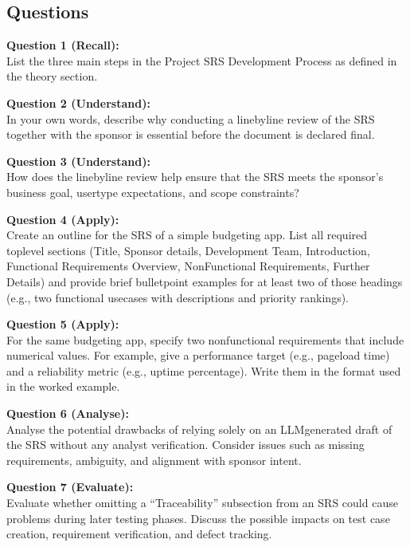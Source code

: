 \documentclass[12pt, a4paper]{article}
\begin{document}
\subsection*{Questions}
\textbf{Question 1 (Recall):}\\
List the three main steps in the Project SRS Development Process as defined in the theory section.\newpage

\textbf{Question 2 (Understand):}\\
In your own words, describe why conducting a linebyline review of the SRS together with the sponsor is essential before the document is declared final.\newpage

\textbf{Question 3 (Understand):}\\
How does the linebyline review help ensure that the SRS meets the sponsor's business goal, usertype expectations, and scope constraints?\newpage

\textbf{Question 4 (Apply):}\\
Create an outline for the SRS of a simple budgeting app. List all required toplevel sections (Title, Sponsor details, Development Team, Introduction, Functional Requirements Overview, NonFunctional Requirements, Further Details) and provide brief bulletpoint examples for at least two of those headings (e.g., two functional usecases with descriptions and priority rankings).\newpage

\textbf{Question 5 (Apply):}\\
For the same budgeting app, specify two nonfunctional requirements that include numerical values. For example, give a performance target (e.g., pageload time) and a reliability metric (e.g., uptime percentage). Write them in the format used in the worked example.\newpage

\textbf{Question 6 (Analyse):}\\
Analyse the potential drawbacks of relying solely on an LLMgenerated draft of the SRS without any analyst verification. Consider issues such as missing requirements, ambiguity, and alignment with sponsor intent.\newpage

\textbf{Question 7 (Evaluate):}\\
Evaluate whether omitting a ``Traceability'' subsection from an SRS could cause problems during later testing phases. Discuss the possible impacts on test case creation, requirement verification, and defect tracking.\newpage
\end{document}
